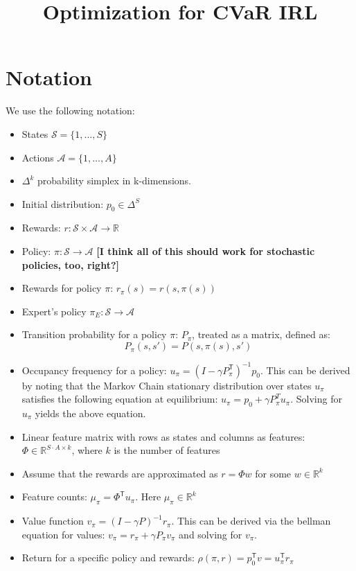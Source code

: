 \documentclass{article}
\title{Optimization for CVaR IRL}
\author{}
\newcommand{\tr}{^\mathsf{T}}
\newcommand{\states}{\mathcal{S}}
\newcommand{\actions}{\mathcal{A}}
\newcommand{\Real}{\mathbb{R}}
\begin{document}
	\maketitle
	
	
\section{Notation}	
	We use the following notation:
	\begin{itemize}
		\item States $\states = \{1, \ldots, S \}$
		\item Actions $\actions = \{ 1, \ldots, A\}$
		\item $\Delta^k$ probability simplex in k-dimensions.
		\item Initial distribution: $p_0 \in \Delta^S$
		\item Rewards: $r: \states\times\actions \to \Real$
		\item Policy: $\pi: \states \to \actions$  \textbf{[I think all of this should work for stochastic policies, too, right?]}
		\item Rewards for policy $\pi$: $r_\pi(s) = r(s, \pi(s))$
		\item Expert's policy $\pi_{E}: \states \to \actions$
		\item Transition probability for a policy $\pi$: $P_\pi$, treated as a matrix, defined as:
		\[ P_\pi(s,s') = P(s,\pi(s),s')\]
		\item Occupancy frequency for a policy: $u_\pi = (I - \gamma P_\pi \tr)^{-1} p_0$. This can be derived by noting that the Markov Chain stationary distribution over states $u_\pi$ satisfies the following equation at equilibrium: $u_\pi = p_0 + \gamma P^T_\pi u_\pi$. Solving for $u_\pi$ yields the above equation.
		\item Linear feature matrix with rows as states and columns as features: $\Phi \in \Real^{S\cdot A \times k}$, where $k$ is the number of features
		\item Assume that the rewards are approximated as $r = \Phi w$ for some $w\in\Real^k$
		\item Feature counts: $\mu_\pi = \Phi\tr u_\pi$. Here $\mu_\pi \in \Real^k$
		\item Value function $v_\pi = (I - \gamma P)^{-1} r_\pi $. This can be derived via the bellman equation for values: $v_\pi = r_\pi + \gamma P_\pi v_\pi$ and solving for $v_\pi$.
		\item Return for a specific policy and rewards: $\rho(\pi, r) = p_0\tr v = u_\pi\tr r_\pi$
	\end{itemize}
	
\end{document}
